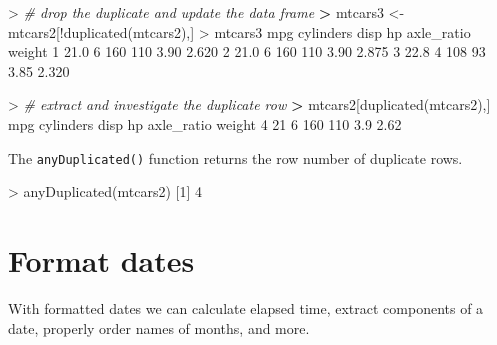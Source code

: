\documentclass[
]{book}
\newenvironment{Shaded}{\begin{snugshade}}{\end{snugshade}}
\newcommand{\CommentTok}[1]{\textcolor[rgb]{0.56,0.35,0.01}{\textit{#1}}}
\newcommand{\DecValTok}[1]{\textcolor[rgb]{0.00,0.00,0.81}{#1}}
\newcommand{\ErrorTok}[1]{\textcolor[rgb]{0.64,0.00,0.00}{\textbf{#1}}}
\newcommand{\FloatTok}[1]{\textcolor[rgb]{0.00,0.00,0.81}{#1}}
\newcommand{\FunctionTok}[1]{\textcolor[rgb]{0.00,0.00,0.00}{#1}}
\newcommand{\NormalTok}[1]{#1}
\newcommand{\OtherTok}[1]{\textcolor[rgb]{0.56,0.35,0.01}{#1}}
\newcommand{\SpecialCharTok}[1]{\textcolor[rgb]{0.00,0.00,0.00}{#1}}
\begin{document}
\begin{Shaded}
\begin{Highlighting}[]
\SpecialCharTok{\textgreater{}} \CommentTok{\# drop the duplicate and update the data frame}
\ErrorTok{\textgreater{}}\NormalTok{ mtcars3 }\OtherTok{\textless{}{-}}\NormalTok{ mtcars2[}\SpecialCharTok{!}\FunctionTok{duplicated}\NormalTok{(mtcars2),]}
\SpecialCharTok{\textgreater{}}\NormalTok{ mtcars3}
\NormalTok{   mpg cylinders disp  hp axle\_ratio weight}
\DecValTok{1} \FloatTok{21.0}         \DecValTok{6}  \DecValTok{160} \DecValTok{110}       \FloatTok{3.90}  \FloatTok{2.620}
\DecValTok{2} \FloatTok{21.0}         \DecValTok{6}  \DecValTok{160} \DecValTok{110}       \FloatTok{3.90}  \FloatTok{2.875}
\DecValTok{3} \FloatTok{22.8}         \DecValTok{4}  \DecValTok{108}  \DecValTok{93}       \FloatTok{3.85}  \FloatTok{2.320}
\end{Highlighting}
\end{Shaded}

\begin{Shaded}
\begin{Highlighting}[]
\SpecialCharTok{\textgreater{}} \CommentTok{\# extract and investigate the duplicate row}
\ErrorTok{\textgreater{}}\NormalTok{ mtcars2[}\FunctionTok{duplicated}\NormalTok{(mtcars2),]}
\NormalTok{  mpg cylinders disp  hp axle\_ratio weight}
\DecValTok{4}  \DecValTok{21}         \DecValTok{6}  \DecValTok{160} \DecValTok{110}        \FloatTok{3.9}   \FloatTok{2.62}
\end{Highlighting}
\end{Shaded}

The \texttt{anyDuplicated()} function returns the row number of duplicate rows.

\begin{Shaded}
\begin{Highlighting}[]
\SpecialCharTok{\textgreater{}} \FunctionTok{anyDuplicated}\NormalTok{(mtcars2)}
\NormalTok{[}\DecValTok{1}\NormalTok{] }\DecValTok{4}
\end{Highlighting}
\end{Shaded}

\hypertarget{format-dates}{%
\section{Format dates}\label{format-dates}}

With formatted dates we can calculate elapsed time, extract components of a date, properly order names of months, and more.
\end{document}
